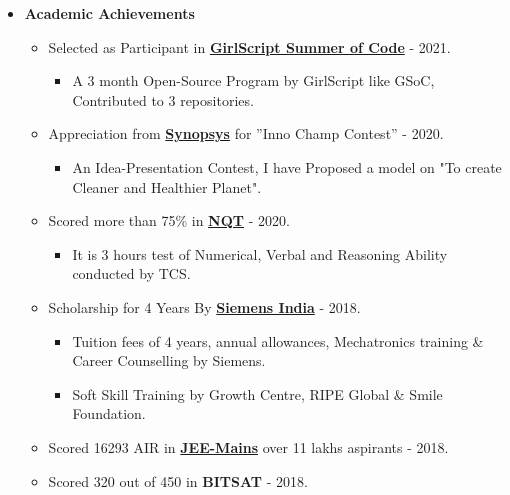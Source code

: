 \documentclass[10pt]{extarticle}
\begin{document}
\begin{itemize}
\item \textbf{Academic Achievements}
    \begin{itemize}
       \item Selected as Participant in \href{https://www.linkedin.com/posts/priyanka-soni-131668176_opensource-github-gssoc2021-activity-6768059710504628224-zK4j/}{\color{black}\textbf{GirlScript Summer of Code}} - 2021.
           \begin{itemize}
               \item A 3 month Open-Source Program by GirlScript like GSoC, Contributed to 3 repositories.
           \end{itemize}
        \item Appreciation from \href{https://www.linkedin.com/posts/priyanka-soni-131668176_ideapresentationcontest-iot-innovation-activity-6743422132929343488-fRUb/}{\color{black}\textbf{Synopsys}} for ”Inno Champ Contest” - 2020.
          \begin{itemize}
              \item An Idea-Presentation Contest, I have Proposed a model on "To create Cleaner and Healthier Planet".
          \end{itemize}
       \item Scored more than 75\% in \href{https://drive.google.com/file/d/1FfOOm94LawOPaGOGxPQHwiO4TyZkc5h6/view}{\color{black}\textbf{NQT}} - 2020.
         \begin{itemize}
           \item It is 3 hours test of Numerical, Verbal and Reasoning Ability conducted by TCS.
         \end{itemize}
       \item Scholarship for 4 Years By \href{https://drive.google.com/file/d/1XFUYs_kH-7Q7BmaebOLJVNOLyD0d4iTg/view}{\color{black}\textbf{Siemens India}} - 2018.
          \begin{itemize}
            \item Tuition fees of 4 years, annual allowances, Mechatronics training \& Career Counselling by Siemens.
            \item Soft Skill Training by Growth Centre, RIPE Global \& Smile Foundation.
          \end{itemize}
      \item Scored 16293 AIR in \href{https://drive.google.com/file/d/1ybuqeNcAqsaaAtMSv_K6zBx6bJwiuTa0/view}{\color{black}\textbf{JEE-Mains}} over 11 lakhs aspirants - 2018.
      \item Scored 320 out of 450 in \textbf{BITSAT} - 2018.

\end{itemize}
\end{itemize}
\end{document}
